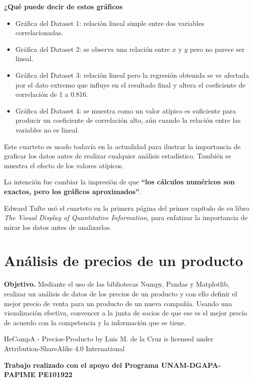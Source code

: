 \documentclass[
  letterpaper,
  DIV=11,
  numbers=noendperiod]{scrreprt}
\providecommand{\tightlist}{%
  \setlength{\itemsep}{0pt}\setlength{\parskip}{0pt}}\usepackage{longtable,booktabs,array}
\begin{document}
\textbf{¿Qué puede decir de estos gráficos}

\begin{itemize}
\tightlist
\item
  Gráfica del Dataset 1: relación lineal simple entre dos variables
  correlacionadas.
\item
  Gráfica del Dataset 2: se observa una relación entre \(x\) y \(y\)
  pero no parece ser lineal.
\item
  Gráfica del Dataset 3: relación lineal pero la regresión obtenida se
  ve afectada por el dato extremo que influye en el resultado final y
  altera el coeficiente de correlación de 1 a 0.816.
\item
  Gráfica del Dataset 4: se muestra como un valor atípico es suficiente
  para producir un coeficiente de correlación alto, aún cuando la
  relación entre las variables no es lineal.
\end{itemize}

Este cuarteto es usado todavía en la actualidad para ilustrar la
importancia de graficar los datos antes de realizar cualquier análisis
estadístico. También se muestra el efecto de los valores atípicos.

La intención fue cambiar la impresión de que \textbf{``los cálculos
numéricos son exactos, pero los gráficos aproximados''}.

Edward Tufte usó el cuarteto en la primera página del primer capítulo de
su libro \emph{The Visual Display of Quantitative Information}, para
enfatizar la importancia de mirar los datos antes de analizarlos.


\chapter{Análisis de precios de un
producto}\label{anuxe1lisis-de-precios-de-un-producto}

\textbf{Objetivo.} Mediante el uso de las bibliotecas Numpy, Pandas y
Matplotlib, realizar un análisis de datos de los precios de un producto
y con ello definir el mejor precio de venta para un producto de un nueva
compañía. Usando una visualización efectiva, convencer a la junta de
socios de que ese es el mejor precio de acuerdo con la competencia y la
información que se tiene.

HeCompA - Precios-Producto by Luis M. de la Cruz is licensed under
Attribution-ShareAlike 4.0 International

\textbf{Trabajo realizado con el apoyo del Programa UNAM-DGAPA-PAPIME
PE101922}
\end{document}

